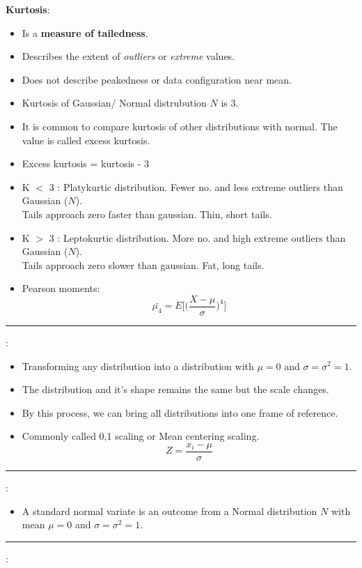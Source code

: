 \documentclass[	DIV=calc,%
paper=a4,%
fontsize=11pt,%
twocolumn]{scrartcl} %
\newcommand{\hformbar}[1]{\vspace{5pt}\hrule\vspace{10pt}} %
\newcommand{\formdesc}[1]{\noindent\textbf{#1}}
\begin{document}
\formdesc{Kurtosis}:
\begin{itemize}
	\item Is a  \textbf{measure of tailedness}.
	\item Describes the extent of \emph{outliers} or \emph{extreme} values.
	\item Does not describe peakedness or data configuration near mean.
	\item Kurtosis of Gaussian/ Normal distrubution $N$ is 3.
	\item It is common to compare kurtosis of other distributions with normal. The value is called excess kurtosis.
	\item Excess kurtosis = kurtosis - 3
	\item K $<$ 3 : Platykurtic distribution. Fewer no. and less extreme outliers than Gaussian ($N$).\\ Tails approach zero faster than gaussian. Thin, short tails.
	\item K $>$ 3 : Leptokurtic distribution. More no. and high extreme outliers than Gaussian ($N$).\\ Tails approach zero slower than gaussian. Fat, long tails.
	\item Pearson moments: $$\bar{\mu_4} = E\Bigg[\Big({\frac{X-\mu}{\sigma}}\Big)^4\Bigg]$$
\end{itemize}

\hformbar

\formdesc{Standardisation}:

\begin{itemize}
	\item Transforming any distribution into a distribution with $\mu=0$ and $\sigma=\sigma^2=1$.
	\item The distribution and it's shape remains the same but the scale changes.
	\item By this process, we can bring all distributions into one frame of reference.
	\item Commonly called 0,1 scaling or  Mean centering scaling.
	$$Z=\frac{x_i-\mu}{\sigma}$$
\end{itemize}
\hformbar

\formdesc{Standard Normal variate}:
\begin{itemize}
	\item A standard normal variate is an outcome from a Normal distribution $N$ with mean $\mu=0$ and $\sigma=\sigma^2=1$.
	
\end{itemize}

\hformbar

\formdesc{KDE (Kernel density estimation)}:
\end{document}
